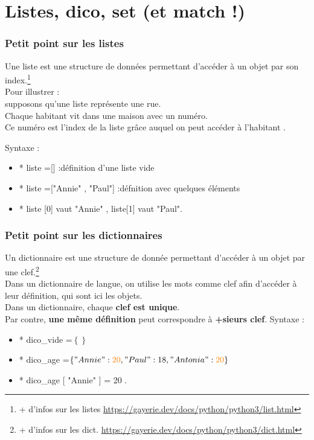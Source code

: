 \section{Listes, dico, set (et match !)}

\begin{frame}
  \frametitle{Petit point sur les listes}
   Une liste est une structure de données permettant d'accéder
à un objet par son index.\footnote{+ d'infos sur les listes \url{https://gayerie.dev/docs/python/python3/list.html}}\\


 Pour illustrer :\\
 supposons qu'une liste représente une rue.\\
Chaque habitant vit dans une maison avec un numéro.\\
 Ce numéro est l'index de la liste grâce auquel on peut accéder
à l'habitant .


Syntaxe :
\begin{itemize}
\item* liste =[] :définition d'une liste vide
\item* liste =["Annie" , "Paul"] :défnition avec quelques éléments
\item* liste [0] vaut "Annie" , liste[1] vaut "Paul".
\end{itemize}



\end{frame}
\begin{frame}
  \frametitle{Petit point sur les dictionnaires}

 Un dictionnaire est une structure de donnée permettant
d'accéder à un objet par une clef.\footnote{+ d'infos sur les dict. \url{https://gayerie.dev/docs/python/python3/dict.html}}\\
 Dans un dictionnaire de langue, on utilise les mots
comme clef afin d'accéder à leur définition, qui sont ici
les objets.\\
 Dans un dictionnaire, chaque \textbf{clef est unique}.\\
 Par contre, \textbf{une même définition} peut correspondre à
\textbf{+sieurs clef}.
Syntaxe :
\begin{itemize}
\item* dico\_vide =$\left\{\right\}$
\item* dico\_age =$\left\{ "Annie" : \textcolor{orange}{20} , "Paul" :18, "Antonia":  \textcolor{orange}{20} \right\}$
\item* dico\_age [ "Annie" ] = 20 .
\end{itemize}
\end{frame}

